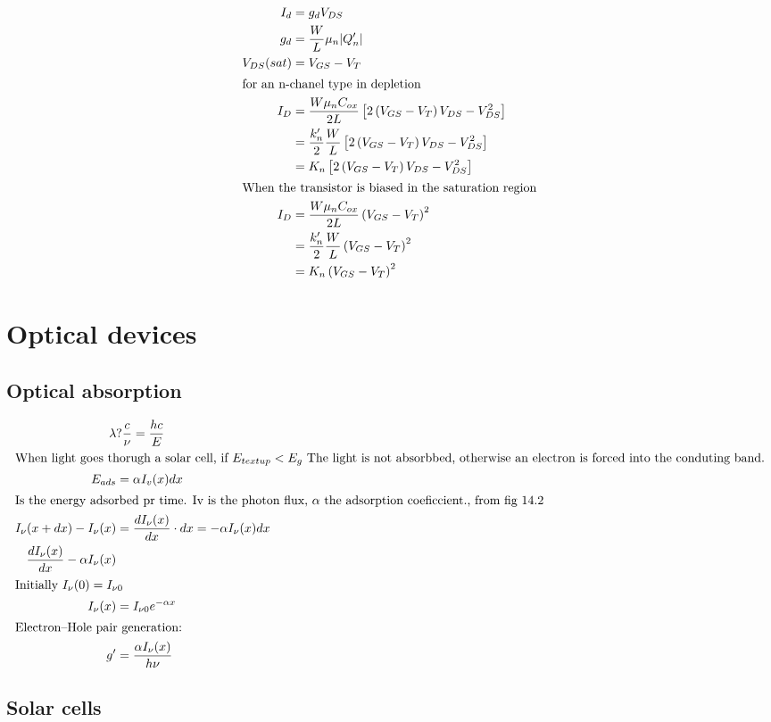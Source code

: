 \documentclass[article,oneside]{memoir}
\begin{document}
\begin{align*}
        I_d&=g_dV_{DS}\\
        g_{d}&=\frac{W}{L}\mu_n\lvert Q_{n}'\rvert\\
        V_{DS}(sat)&=V_{GS}-V_T\\
        \intertext{for an n-chanel type in depletion}
        I_{D}&=\frac{W\mu_{n}C_{ox}}{2L}\left[ 2\left( V_{GS}-V_{T} \right)V_{DS}-V_{DS}^2 \right]\\
        &=\frac{k_n'}{2}\frac{W}{L}\left[ 2\left( V_{GS}-V_{T} \right)V_{DS}-V_{DS}^2 \right]\\
        &=K_n\left[ 2\left( V_{GS}-V_{T} \right)V_{DS}-V_{DS}^2 \right]\\
        \intertext{When the transistor is biased in the saturation region}
        I_{D}&=\frac{W\mu_nC_{ox}}{2L}\left( V_{GS}-V_{T} \right)^2\\
        &=\frac{k_n'}{2}\frac{W}{L}\left( V_{GS}-V_{T} \right)^2\\
        &=K_n\left( V_{GS}-V_{T} \right)^2\\
\end{align*}
\part{Optical devices}
\chapter{Optical absorption}
\begin{align*}
        \lambda&?\frac{c}{\nu}=\frac{hc}{E}\\
        \intertext{When light goes thorugh a solar cell, if $E_{textup}<E_g$ The light is not absorbbed, otherwise an electron is forced into the conduting band.}
        E_{ads}&=\alpha I_{v}(x)dx\\
        \intertext{Is the energy adsorbed pr time. Iv is the photon flux, $\alpha$ the adsorption coeficcient., from fig 14.2}
        I_{\nu}(x+dx)-I_{\nu}(x)&=\frac{dI_{\nu}(x)}{dx}\cdot dx=-\alpha I_{\nu}(x)dx\\
        \frac{dI_{\nu}(x)}{dx}-\alpha I_{\nu}(x)\\
        \intertext{Initially $I_{\nu}(0)=I_{\nu 0}$}
        I_{\nu}(x)&=I_{\nu 0}e^{-\alpha x}\\
        \intertext{Electron--Hole pair generation:}
        g'&=\frac{\alpha I_{\nu}(x)}{h\nu}\\
\end{align*}
\chapter{Solar cells}
\end{document}
